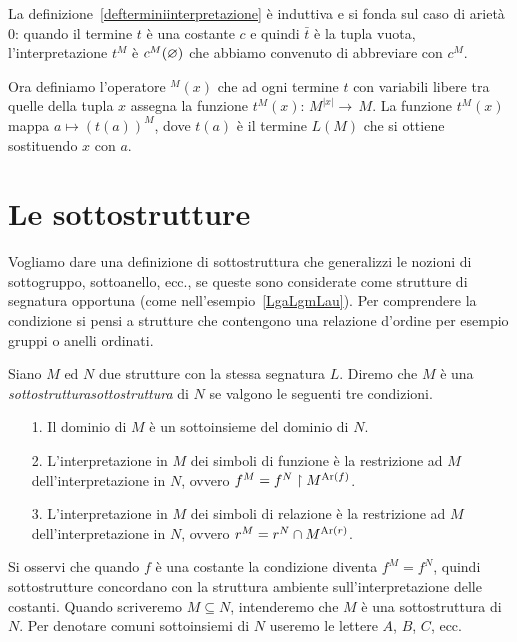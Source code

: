 La definizione~\ref{defterminiinterpretazione} \`e induttiva e si fonda sul caso di ariet\`a $0$: quando il termine $t$ \`e una costante $c$ e quindi $\bar t$ \`e la tupla vuota, l'interpretazione $t^M$ \`e $c^M(\varnothing)$ che abbiamo convenuto di abbreviare con $c^M$.

Ora definiamo l'operatore \emph{${}^M\!(x)$\/} che ad ogni termine $t$ con variabili libere tra quelle della tupla $x$ assegna la funzione \emph{$t^M\!(x) :\,M^{|x|}\to\, M$}. La funzione $t^M\!(x)$ mappa $a\mapsto (t(a))^M$, dove $t(a)$ \`e il termine $L(M)$ che si ottiene sostituendo $x$ con $a$.

\section{Le sottostrutture}
\label{sottostrutture}

Vogliamo dare una definizione di sottostruttura che generalizzi le nozioni di sottogruppo, sottoanello, ecc., se queste sono considerate come strutture di segnatura opportuna (come nell'esempio~\ref{LgaLgmLau}). Per comprendere la condizione  si pensi a strutture che contengono una relazione d'ordine per esempio gruppi o anelli ordinati.

\begin{definition}\label{sottostrutturadef}
Siano $M$ ed $N$ due strutture con la stessa segnatura $L$. Diremo che $M$ \`e una \emph{sottostruttura\/}\emph{sottostruttura} di $N$ se valgono le seguenti tre condizioni.
\begin{itemize}
\item[1.] Il dominio di $M$ \`e un sottoinsieme del dominio di $N$.
\item[2.] L'interpretazione in $M$ dei simboli di funzione \`e la restrizione ad $M$ dell'interpretazione in $N$, ovvero $f^M=f^N\restriction M^{{\rm Ar}(f)}$.
\item[3.] L'interpretazione in $M$ dei simboli di relazione \`e la restrizione ad $M$ dell'interpretazione in $N$, ovvero $r^M=r^N\cap M^{{\rm Ar}(r)}$.
\end{itemize}
\end{definition}

Si osservi che quando $f$ \`e una costante la condizione  diventa $f^M=f^N$, quindi sottostrutture concordano con la struttura ambiente sull'interpretazione delle costanti. Quando scriveremo \emph{$M\subseteq N$}, intenderemo che $M$ \`e una sottostruttura di $N$. Per denotare comuni sottoinsiemi di $N$ useremo le lettere $A$, $B$, $C$, ecc.  

